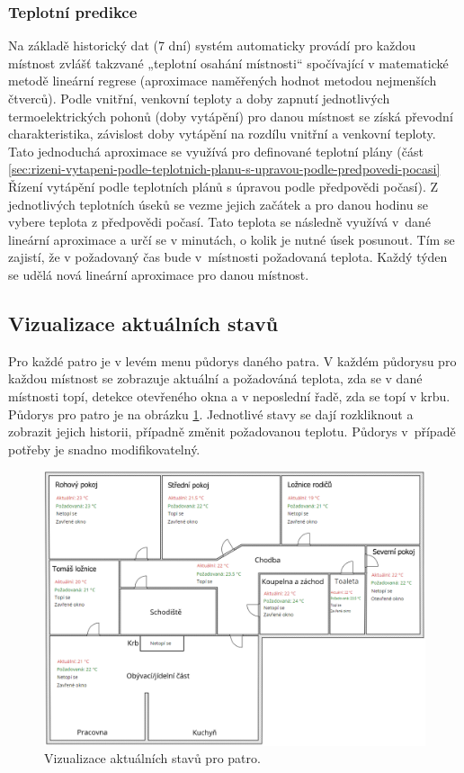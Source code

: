\subsubsection{Teplotní predikce}
\label{sec:teplotni-predikce}
Na základě historický dat (7 dní) systém automaticky provádí pro každou místnost zvlášť takzvané „teplotní osahání místnosti“ spočívající v matematické metodě lineární regrese (aproximace naměřených hodnot metodou nejmenších čtverců). Podle vnitřní, venkovní teploty a doby zapnutí jednotlivých termoelektrických pohonů (doby vytápění) pro danou místnost se získá převodní charakteristika, závislost doby vytápění na rozdílu vnitřní a venkovní teploty. Tato jednoduchá aproximace se využívá pro definované teplotní plány (část \ref{sec:rizeni-vytapeni-podle-teplotnich-planu-s-upravou-podle-predpovedi-pocasi} Řízení vytápění podle teplotních plánů s úpravou podle předpovědi počasí). Z jednotlivých teplotních úseků se vezme jejich začátek a pro danou hodinu se vybere teplota z předpovědi počasí. Tato teplota se následně využívá v~dané lineární aproximace a určí se v minutách, o kolik je nutné úsek posunout. Tím se zajistí, že v požadovaný čas bude v~místnosti požadovaná teplota. Každý týden se udělá nová lineární aproximace pro danou místnost.

\subsection{Vizualizace aktuálních stavů}
Pro každé patro je v levém menu půdorys daného patra. V každém půdorysu pro každou místnost se zobrazuje aktuální a požadováná teplota, zda se v dané místnosti topí, detekce otevřeného okna a v neposlední řadě, zda se topí v krbu. Půdorys pro patro je na obrázku \ref{fig:vizualizace-hodnot-patro-pudorys}. Jednotlivé stavy se dají rozkliknout a zobrazit jejich historii, případně změnit požadovanou teplotu. Půdorys v~případě potřeby je snadno modifikovatelný.

\begin{figure}[H]
    \centering
    \includegraphics[width=\textwidth]{images/software-ha/vizualizace-hodnot-patro-pudorys.png}
    \caption{Vizualizace aktuálních stavů pro patro.}
    \label{fig:vizualizace-hodnot-patro-pudorys}
\end{figure}


